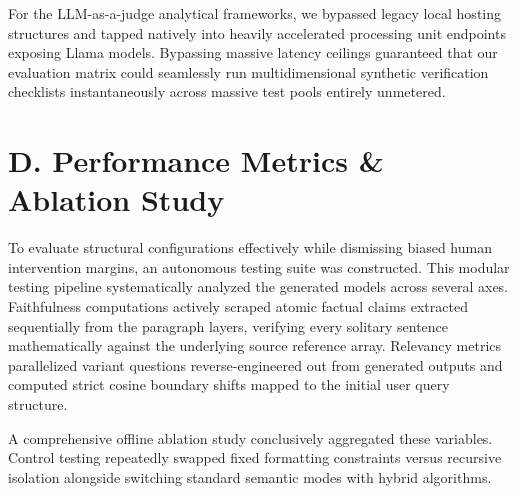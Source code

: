 \documentclass[conference]{IEEEtran}
\begin{document}
For the LLM-as-a-judge analytical frameworks, we bypassed legacy local hosting structures and tapped natively into heavily accelerated processing unit endpoints exposing Llama models. Bypassing massive latency ceilings guaranteed that our evaluation matrix could seamlessly run multidimensional synthetic verification checklists instantaneously across massive test pools entirely unmetered. 

\section{D. Performance Metrics \& Ablation Study}
To evaluate structural configurations effectively while dismissing biased human intervention margins, an autonomous testing suite was constructed. This modular testing pipeline systematically analyzed the generated models across several axes. Faithfulness computations actively scraped atomic factual claims extracted sequentially from the paragraph layers, verifying every solitary sentence mathematically against the underlying source reference array. Relevancy metrics parallelized variant questions reverse-engineered out from generated outputs and computed strict cosine boundary shifts mapped to the initial user query structure. 

A comprehensive offline ablation study conclusively aggregated these variables. Control testing repeatedly swapped fixed formatting constraints versus recursive isolation alongside switching standard semantic modes with hybrid algorithms.

\begin{table}[htbp]
\centering
{}
\caption{Ablation Study: Mean metrics explicitly tracked natively parsing 5 to 15 internal control queries.}
\label{tab:ablation}
\end{table}
\end{document}
